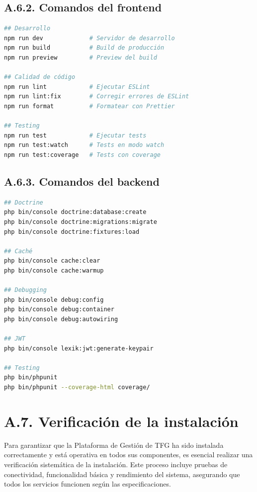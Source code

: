 \documentclass[12pt,a4paper,oneside]{report}
\begin{document}
\subsection{A.6.2. Comandos del
frontend}\label{a.6.2.-comandos-del-frontend}

\begin{lstlisting}[language=bash]
## Desarrollo
npm run dev             # Servidor de desarrollo
npm run build           # Build de producción
npm run preview         # Preview del build

## Calidad de código
npm run lint            # Ejecutar ESLint
npm run lint:fix        # Corregir errores de ESLint
npm run format          # Formatear con Prettier

## Testing
npm run test            # Ejecutar tests
npm run test:watch      # Tests en modo watch
npm run test:coverage   # Tests con coverage
\end{lstlisting}

\subsection{A.6.3. Comandos del
backend}\label{a.6.3.-comandos-del-backend}

\begin{lstlisting}[language=bash]
## Doctrine
php bin/console doctrine:database:create
php bin/console doctrine:migrations:migrate
php bin/console doctrine:fixtures:load

## Caché
php bin/console cache:clear
php bin/console cache:warmup

## Debugging
php bin/console debug:config
php bin/console debug:container
php bin/console debug:autowiring

## JWT
php bin/console lexik:jwt:generate-keypair

## Testing
php bin/phpunit
php bin/phpunit --coverage-html coverage/
\end{lstlisting}

\section{A.7. Verificación de la
instalación}\label{a.7.-verificaciuxf3n-de-la-instalaciuxf3n}

Para garantizar que la Plataforma de Gestión de TFG ha sido instalada correctamente y está operativa en todos sus componentes, es esencial realizar una verificación sistemática de la instalación. Este proceso incluye pruebas de conectividad, funcionalidad básica y rendimiento del sistema, asegurando que todos los servicios funcionen según las especificaciones.
\end{document}
